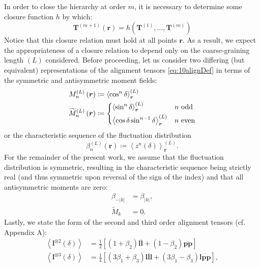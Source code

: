 In order to close the hierarchy at order \(m\), it is necessary to
determine some closure function $h$ by which:
\begin{equation}
\mathbf{T}^{(m + 1)}(\boldsymbol{r})=h\left( \mathbf{T}^{(1)},\ldots,\mathbf{T}^{(m)} \right)\label{eq:closure}
\end{equation}
Notice that this closure relation must hold at all points
\(\boldsymbol{r}\). As a result, we expect the appropriateness of a
closure relation to depend only on the coarse-graining length \((L)\)
considered. Before proceeding, let us consider two differing (but equivalent) representations of the alignment tensors \cref{eq:10alignDef} in terms of the symmetric and antisymmetric moment fields:
\begin{subequations}
\begin{align}
M_{n}^{(L)}\left( \boldsymbol{r} \right)&\coloneqq\left\langle \cos^{n}\delta \right\rangle_{\boldsymbol{r}}^{(L)}\\
    {\widetilde{M}}_{n}^{(L)}\left( \boldsymbol{r} \right)&\coloneqq\begin{dcases}
\left\langle \sin^{n}\delta \right\rangle_{\boldsymbol{r}}^{(L)} & n\text{ odd} \\
\left\langle \cos\delta\sin^{n - 1}\delta \right\rangle_{\boldsymbol{r}}^{(L)} & n\text{ even}
\end{dcases}
\end{align}
\end{subequations}
or the characteristic sequence of the fluctuation distribution
\begin{equation}
\beta_{n}^{(L)}\left( \boldsymbol{r} \right) \coloneqq \left\langle z^{n}(\delta) \right\rangle_{\boldsymbol{r}}^{(L)}.
\end{equation}
For the remainder of the present work, we assume that the fluctuation distribution is symmetric, resulting in the characteristic sequence being strictly real (and thus symmetric upon reversal of the sign of the index) and that all antisymmetric moments are zero:
\begin{subequations}
\begin{align}
    \beta_{- |k|} &= \beta_{|k|},\\
    {\widetilde{M}}_{k} &= 0.
\end{align}
\end{subequations}Lastly, we state the form of the second and third order alignment
tensors (cf. Appendix A):
\begin{subequations}
\begin{align}
    \left\langle \boldsymbol{l}^{\otimes 2}(\delta) \right\rangle &= \frac{1}{2}\left\lbrack \left( 1 + \beta_{2} \right)\overline{\boldsymbol{ll}}+\left( 1 - \beta_{2} \right)\overline{\boldsymbol{pp}} \right\rbrack\\
    \left\langle \boldsymbol{l}^{\otimes 3}(\delta) \right\rangle &= \frac{1}{4}\left\lbrack \left( 3\beta_{1} + \beta_{3} \right)\overline{\boldsymbol{lll}}+\left( 3\beta_{1} - \beta_{3} \right)\overline{\boldsymbol{lpp}} \right\rbrack,
\end{align}\label{eq:alignmentTensorsChar}\end{subequations}
